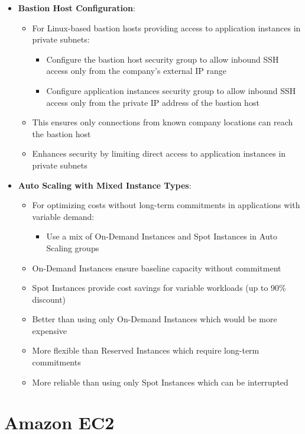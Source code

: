 \documentclass[11pt,a4paper]{report}
\begin{document}
\begin{itemize}
\begin{itemize}
  \item Ensures database is only accessible through the application tier
\end{itemize}
  \item \textbf{Bastion Host Configuration}:
\begin{itemize}
  \item For Linux-based bastion hosts providing access to application instances in private subnets:
\begin{itemize}
  \item Configure the bastion host security group to allow inbound SSH access only from the company's external IP range
  \item Configure application instances security group to allow inbound SSH access only from the private IP address of the bastion host
\end{itemize}
  \item This ensures only connections from known company locations can reach the bastion host
  \item Enhances security by limiting direct access to application instances in private subnets
\end{itemize}
  \item \textbf{Auto Scaling with Mixed Instance Types}:
\begin{itemize}
  \item For optimizing costs without long-term commitments in applications with variable demand:
\begin{itemize}
  \item Use a mix of On-Demand Instances and Spot Instances in Auto Scaling groups
\end{itemize}
  \item On-Demand Instances ensure baseline capacity without commitment
  \item Spot Instances provide cost savings for variable workloads (up to 90\% discount)
  \item Better than using only On-Demand Instances which would be more expensive
  \item More flexible than Reserved Instances which require long-term commitments
  \item More reliable than using only Spot Instances which can be interrupted
\end{itemize}
\end{itemize}


\section{Amazon EC2}
\end{document}
